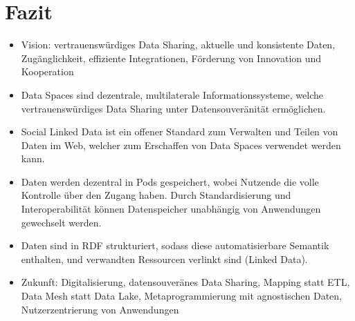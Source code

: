 
\section{Fazit}

\begin{itemize}
    \item Vision: vertrauenswürdiges Data Sharing, aktuelle und konsistente Daten, Zugänglichkeit, effiziente Integrationen, Förderung von Innovation und Kooperation

    \item Data Spaces sind dezentrale, multilaterale Informationssysteme, welche vertrauenswürdiges Data Sharing unter Datensouveränität ermöglichen.

    \item Social Linked Data ist ein offener Standard zum Verwalten und Teilen von Daten im Web, welcher zum Erschaffen von Data Spaces verwendet werden kann.
    
    \item Daten werden dezentral in Pods gespeichert, wobei Nutzende die volle Kontrolle über den Zugang haben.
          Durch Standardisierung und Interoperabilität können Datenspeicher unabhängig von Anwendungen gewechselt werden.
    
    \item Daten sind in RDF strukturiert, sodass diese automatisierbare Semantik enthalten, und verwandten Ressourcen verlinkt sind (Linked Data).
    
    \item Zukunft: Digitalisierung, datensouveränes Data Sharing, Mapping statt ETL, Data  Mesh statt Data Lake, Metaprogrammierung mit agnostischen Daten, Nutzerzentrierung von Anwendungen
\end{itemize}
